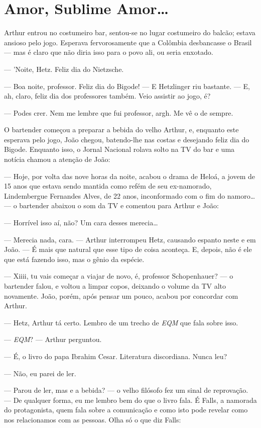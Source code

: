 \chapter{Amor, Sublime Amor\ldots}

Arthur entrou no costumeiro bar, sentou-se no lugar costumeiro do balcão; estava ansioso pelo jogo. Esperava fervorosamente que a Colômbia desbancasse o Brasil --- mas é claro que não diria isso para o povo ali, ou seria enxotado.

--- 'Noite, Hetz. Feliz dia do Nietzsche.

--- Boa noite, professor. Feliz dia do Bigode! --- E Hetzlinger riu bastante. --- E, ah, claro, feliz dia dos professores também. Veio assistir ao jogo, é?

--- Podes crer. Nem me lembre que fui professor, argh. Me vê o de sempre.

O bartender começou a preparar a bebida do velho Arthur, e, enquanto este esperava pelo jogo, João chegou, batendo-lhe nas costas e desejando feliz dia do Bigode. Enquanto isso, o Jornal Nacional rolava solto na TV do bar e uma notícia chamou a atenção de João:

--- Hoje, por volta das nove horas da noite, acabou o drama de Heloá, a jovem de 15 anos que estava sendo mantida como refém de seu ex-namorado, Lindembergue Fernandes Alves, de 22 anos, inconformado com o fim do namoro\ldots --- o bartender abaixou o som da TV e comentou para Arthur e João:

--- Horrível isso aí, não? Um cara desses merecia\ldots

--- Merecia nada, cara. --- Arthur interrompeu Hetz, causando espanto neste e em João. --- É mais que natural que esse tipo de coisa aconteça. E, depois, não é ele que está fazendo isso, mas o gênio da espécie.

--- Xiiii, tu vais começar a viajar de novo, é, professor Schopenhauer? --- o bartender falou, e voltou a limpar copos, deixando o volume da TV alto novamente. João, porém, após pensar um pouco, acabou por concordar com Arthur.

--- Hetz, Arthur tá certo. Lembro de um trecho de \emph{EQM} que fala sobre isso.

--- \emph{EQM}? --- Arthur perguntou.

--- É, o livro do papa Ibrahim Cesar. Literatura discordiana. Nunca leu?

--- Não, eu parei de ler.

--- Parou de ler, mas e a bebida? --- o velho filósofo fez um sinal de reprovação. --- De qualquer forma, eu me lembro bem do que o livro fala. É Falls, a namorada do protagonista, quem fala sobre a comunicação e como isto pode revelar como nos relacionamos com as pessoas. Olha só o que diz Falls:

